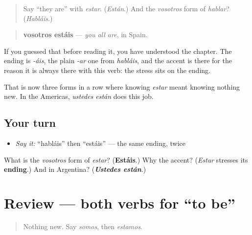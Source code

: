 \label{lesson:ES-C09-estais}



\begin{quote}
Say \textquotedblleft{}they are\textquotedblright{} with \emph{estar}. (\emph{Están}.) And the \emph{vosotros} form of \emph{hablar}? (\emph{Habláis}.)
\end{quote}

\begin{grammarlens}[title={Grammar Lens: predictable, and that is the news}]
\begin{quote}
\textbf{vosotros estáis} — \emph{you all are}, in Spain.
\end{quote}

If you guessed that before reading it, you have understood the chapter. The ending is \emph{-áis}, the plain \emph{-ar} one from \emph{habláis}, and the accent is there for the reason it is always there with this verb: the stress sits on the ending.

That is now three forms in a row where knowing \emph{estar} meant knowing nothing new. In the Americas, \emph{ustedes están} does this job.
\end{grammarlens}

\subsection*{Your turn}
\begin{itemize}
\raggedright
  \item \emph{Say it:} \textquotedblleft{}habláis\textquotedblright{} then \textquotedblleft{}estáis\textquotedblright{} — the same ending, twice
\end{itemize}

\begin{tcolorbox}[breakable,colback=teal!4,colframe=teal!35!black,title={Before you move on}]
What is the \emph{vosotros} form of \emph{estar}? (\textbf{Estáis}.) Why the accent? (\emph{Estar} stresses its \textbf{ending}.) And in Argentina? (\emph{\textbf{Ustedes están}}.)
\end{tcolorbox}
\section[Practice]{Review — both verbs for \textquotedblleft{}to be\textquotedblright{}}

\label{lesson:ES-C09-repaso-ser-estar}



\begin{quote}
Nothing new. Say \emph{somos}, then \emph{estamos}.
\end{quote}

